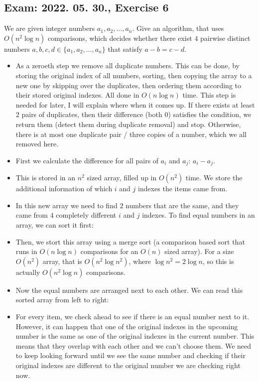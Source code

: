\subsection{Exam: 2022. 05. 30., Exercise 6}


We are given integer numbers $a_1, a_2, \dots{}, a_n$. Give an algorithm, that
uses $O(n^2\log{}n)$ comparisons, which decides whether there exist $4$ pairwise distinct numbers $a,b,c,d\in{}\{a_1,a_2,\dots{},a_n\}$ that satisfy $a-b=c-d$.


\begin{itemize}
    \item As a zeroeth step we remove all duplicate numbers. This can be done, by storing the original index of all numbers, sorting, then copying the array to a new one by skipping over the duplicates, then ordering them according to their stored original indexes. All done in $O(n\log{}n)$ time. This step is needed for later, I will explain where when it comes up. If there exists at least $2$ pairs of duplicates, then their difference (both $0$) satisfies the condition, we return them (detect them during duplicate removal) and stop. Otherwise, there is at most one duplicate pair / three copies of a number, which we all removed here.
    \item First we calculate the difference for all pairs of $a_i$ and $a_j$: $a_i-a_j$.
    \item This is stored in an $n^2$ sized array, filled up in $O(n^2)$ time. We store the additional information of which $i$ and $j$ indexes the items came from.
    \item In this new array we need to find $2$ numbers that are the same, and they came from $4$ completely different $i$ and $j$ indexes. To find equal numbers in an array, we can sort it first:
    \item Then, we stort this array using a merge sort (a comparison based sort that runs in $O(n\log{}n)$ comparisons for an $O(n)$ sized array). For a size $O(n^2)$ array, that is $O(n^2\log{}n^2)$, where $\log{}n^2 = 2\log{}n$, so this is actually $O(n^2\log{}n)$ comparisons.
    \item Now the equal numbers are arranged next to each other. We can read this sorted array from left to right:
    \item For every item, we check ahead to see if there is an equal number next to it. However, it can happen that one of the original indexes in the upcoming number is the same as one of the original indexes in the current number. This means that they overlap with each other and we can't choose them. We need to keep looking forward until we see the same number and checking if their original indexes are different to the original number we are checking right now.

\end{itemize}
